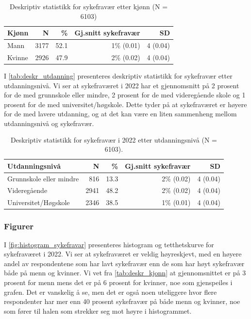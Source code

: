 \documentclass[
  12pt,
  a4paper,
  DIV=11,
  numbers=noendperiod]{scrartcl}
\begin{document}
\begin{table}[ht]
\centering
\begin{tabular}{lrrrr}
\toprule
Kjønn   & N   & \%   & Gj.snitt sykefravær & SD    \\
\midrule
Mann    & 3177 & 52.1 & 1\% (0.01)               & 4 (0.04) \\
Kvinne  & 2926 & 47.9 & 2\% (0.02)               & 4 (0.04) \\
\bottomrule
\end{tabular}
\caption{Deskriptiv statistikk for sykefravær etter kjønn (N = 6103)}
\label{tab:deskr_kjonn}
\end{table}

I \autoref{tab:deskr_utdanning} presenteres deskriptiv statistikk for
sykefravær etter utdanningsnivå. Vi ser at sykefraværet i 2022 har et
gjennomsnitt på 2 prosent for de med grunnskole eller mindre, 2 prosent
for de med videregående skole og 1 prosent for de med
universitet/høgskole. Dette tyder på at sykefraværet er høyere for de
med lavere utdanning, og at det kan være en liten sammenheng mellom
utdanningsnivå og sykefravær.

\begin{table}[ht]
\centering
\begin{tabular}{lrrrr}
\toprule
Utdanningsnivå                & N    & \%   & Gj.snitt sykefravær & SD   \\
\midrule
Grunnskole eller mindre       & 816 & 13.3 & 2\% (0.02)                    & 4 (0.04)   \\
Videregående                   & 2941 & 48.2 & 2\% (0.02)                  & 4 (0.04)   \\
Universitet/Høgskole           & 2346 & 38.5 & 1\% (0.01)                   & 4 (0.04)  \\
\bottomrule
\end{tabular}
\caption{Deskriptiv statistikk for sykefravær i 2022 etter utdanningsnivå (N = 6103).}
\label{tab:deskr_utdanning}
\end{table}

\clearpage

\subsubsection{Figurer}\label{figurer}

I \autoref{fig:histogram_sykefravar} presenteres histogram og
tetthetskurve for sykefraværet i 2022. Vi ser at sykefraværet er veldig
høyreskjevt, med en høyere andel av respondentene som har lavt
sykefravær enn de som har høyt sykefravær både på menn og kvinner. Vi
vet fra \autoref{tab:deskr_kjonn} at gjennomsnittet er på 3 prosent for
menn mens det er på 6 prosent for kvinner, noe som gjenspeiles i grafen.
Det er vanskelig å se, men det er også noen uteliggere hvor flere
respondenter har mer enn 40 prosent sykefravær på både menn og kvinner,
noe som fører til halen som strekker seg mot høyre i histogrammet.
\end{document}
